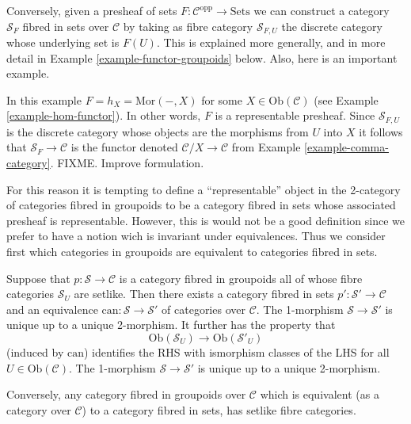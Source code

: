 \medskip\noindent
Conversely, given a presheaf of sets
$F : \mathcal{C}^{\text{opp}} \to \text{Sets}$
we can construct a category $\mathcal{S}_F$ fibred in sets
over $\mathcal{C}$ by taking as fibre category $\mathcal{S}_{F,U}$ 
the discrete category whose underlying set is $F(U)$. This is explained
more generally, and in more detail in Example \ref{example-functor-groupoids}
below. Also, here is an important example.

\begin{example}
\label{example-fibred-category-from-functor-of-points}
In this example $F = h_X = \text{Mor}(-,X)$ for some
$X \in \text{Ob}(\mathcal{C})$ (see Example \ref{example-hom-functor}).
In other words, $F$ is a representable presheaf.
Since $\mathcal{S}_{F,U}$ is the discrete category whose objects are the
morphisms from $U$ into $X$ it follows that
$\mathcal{S}_F\to \mathcal{C}$ is the functor denoted
$\mathcal{C}/X \to \mathcal{C}$ from
Example \ref{example-comma-category}.
FIXME. Improve formulation.
\end{example}

\noindent
For this reason it is tempting to define a ``representable'' object in the
2-category of categories fibred in groupoids to be a category fibred in
sets whose associated presheaf is representable. However, this is would not
be a good definition since we prefer to have a notion wich is invariant under
equivalences. Thus we consider first which categories in groupoids are
equivalent to categories fibred in sets.

\begin{lemma}
\label{lemma-setlike-fibres}
Suppose that $p : \mathcal{S} \to \mathcal{C}$ is a category fibred in
groupoids all of whose fibre categories $\mathcal{S}_U$ are setlike. 
Then there exists a category fibred in sets $p' : \mathcal{S}' \to
\mathcal{C}$ and an equivalence
$\text{can}:\mathcal{S} \to \mathcal{S}'$ of categories over $\mathcal{C}$.
The 1-morphism $\mathcal{S}\to\mathcal{S}'$ is unique up to a unique
2-morphism. It further has the property that
$$
\text{Ob}(\mathcal{S}_U) \longrightarrow \text{Ob}(\mathcal{S}'_U) 
$$
(induced by $\text{can}$) identifies the RHS with ismorphism classes of the
LHS for all $U \in \text{Ob}(\mathcal{C})$. The 1-morphism
$\mathcal{S}\to\mathcal{S}'$ is unique up to a unique 2-morphism. 

\medskip\noindent
Conversely, any category fibred in groupoids over $\mathcal{C}$ which
is equivalent (as a category over $\mathcal{C}$) to a category fibred 
in sets, has setlike fibre categories.
\end{lemma}


